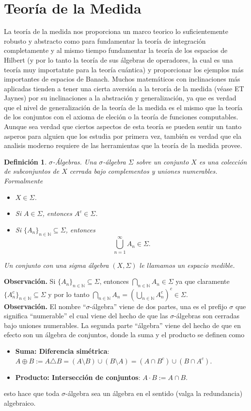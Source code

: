 \documentclass[letterpaper]{book}
\newtheorem{def.}{Definici\'on}[section]
\newcommand{\nat}{\ensuremath{ \mathbb N }}
\newcommand{\obs}{{\noindent \sc \textbf{Observación. }}}
\newcommand{\sig}{\ensuremath{\Sigma}}
\begin{document}
\section{Teoría de la Medida}
\noindent La teoría de la medida nos proporciona un marco teorico lo suficientemente robusto y abstracto como para fundamentar la teoría de integración completamente y al mismo tiempo fundamentar la teoría de los espacios de Hilbert (y por lo tanto la teoría de sus álgebras de operadores, la cual es una teoría muy importatnte para la teoría cuántica) y proporcionar los ejemplos más importantes de espacios de Banach. Muchos matemáticos con inclinaciones más aplicadas tienden a tener una cierta aversión a la teroría de la medida (véase ET Jaynes) por su inclinaciones a la abstración y generalización, ya que es verdad que el nivel de generalización de la teoría de la medida es el mismo que la teoría de los conjuntos con el axioma de eleción o la teoría de funciones computables. Aunque sea verdad que ciertos aspectos de esta teoría se pueden sentir un tanto asperos para alguien que los estudia por primera vez, también es verdad que ela analisis moderno requiere de las herramientas que la teoría de la medida provee.

\begin{def.}{$\sigma$-Álgebras.}
Una $\sigma$-álgebra $\sig$ sobre un conjunto $X$ es una colección de subconjuntos de $X$ cerrada bajo complementos y uniones numerables. Formalmente
\begin{itemize}
    \item $X \in \sig$.
    \item Si $A \in \sig$, entonces $A^c \in \sig$.
    \item Si $\{A_n\}_{n \in\nat} \subseteq \sig$, entonces
      \[
      \bigcup_{n=1}^\infty A_n \in \sig.
      \]
\end{itemize}
Un conjunto con una sigma álgebra $(X,\sig)$ le llamamos un espacio \emph{medible}.
\end{def.}
\obs Si $\{A_n\}_{n \in \mathbb{N}} \subseteq \sig$, entonces $\bigcap_{n\in\nat} A_n \in \sig$ ya que claramente $\{A_n^c\}_{n \in \mathbb{N}} \subseteq \sig$ y por lo tanto $\bigcap_{n\in\nat} A_n=(\bigcup_{n\in\nat} A_n^c)^c\in\sig$.\\
\obs El nombre ``$\sigma$-álgebra'' viene de dos partes, una es el prefijo $\sigma$ que significa ``numerable'' el cual viene del hecho de que las $\sigma$-álgebras son cerradas bajo uniones numerables. La segunda parte ``álgebra'' viene del hecho de que en efecto son un álgebra de conjuntos, donde la suma y el producto se definen como
\begin{itemize}
    \item \textbf{Suma: Diferencia simétrica}: $A\oplus B:=A\triangle B=(A\setminus B)\cup(B\setminus A)=(A\cap B^c)\cup(B\cap A^c)$.
    \item \textbf{Producto: Intersección de conjuntos}: $A\cdot B:= A\cap B$.
\end{itemize}
esto hace que toda $\sigma$-álgebra sea un álgebra en el sentido (valga la redundancia) algebraico.
\end{document}
